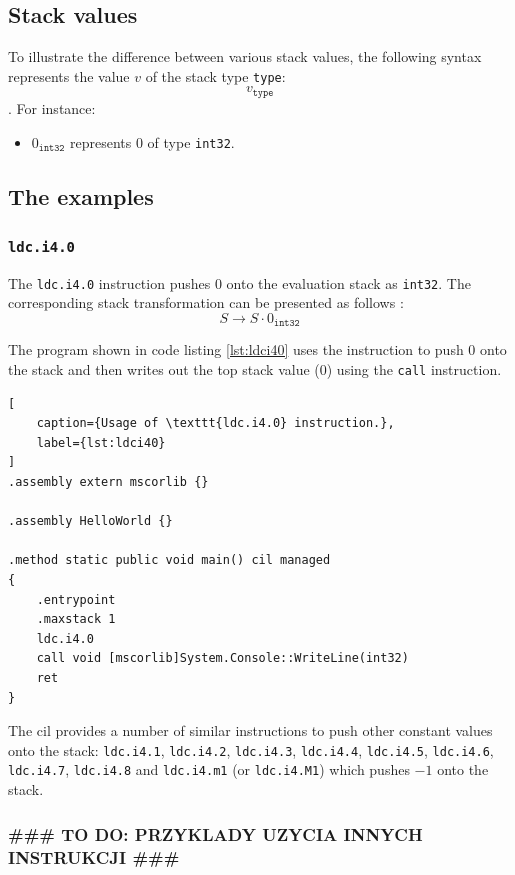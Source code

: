 \documentclass{article}
\numberwithin{equation}{section}
\newcommand{\sval}[2] {
	#1_\texttt{#2}
}
\begin{document}
\subsection{Stack values}

To illustrate the difference between various stack values, the following syntax represents the value $v$ of the stack type \texttt{type}:
$$
	\sval{v}{type}
$$.
For instance:
\begin{itemize}
	\item{$\sval{0}{int32}$ represents $0$ of type \texttt{int32}}.
\end{itemize}

\subsection{The examples}
\label{sec:instruction_examples}

\subsubsection{\texttt{ldc.i4.0}}
\label{sec:desc_ldci40}

The \texttt{ldc.i4.0} instruction pushes $0$ onto the evaluation stack as \texttt{int32}. The corresponding stack transformation can be presented as follows \cite{ecmaStandard}:
$$
	S \rightarrow S \cdot 0_\texttt{int32}
$$

The program shown in code listing \ref{lst:ldci40} uses the instruction to push $0$ onto the stack and then writes out the top stack value ($0$) using the \texttt{call} instruction.

\begin{lstlisting}[
	caption={Usage of \texttt{ldc.i4.0} instruction.},
	label={lst:ldci40}
]
.assembly extern mscorlib {}

.assembly HelloWorld {}

.method static public void main() cil managed
{
	.entrypoint
	.maxstack 1
	ldc.i4.0
	call void [mscorlib]System.Console::WriteLine(int32)
	ret
}
\end{lstlisting}

The \acrshort{cil} provides a number of similar instructions to push other constant values onto the stack: \texttt{ldc.i4.1}, \texttt{ldc.i4.2}, \texttt{ldc.i4.3}, \texttt{ldc.i4.4}, \texttt{ldc.i4.5}, \texttt{ldc.i4.6}, \texttt{ldc.i4.7}, \texttt{ldc.i4.8} and \texttt{ldc.i4.m1} (or \texttt{ldc.i4.M1}) which pushes $-1$ onto the stack.

\subsubsection{{\#\#\# TO DO: PRZYKLADY UZYCIA INNYCH INSTRUKCJI \#\#\#}}
\end{document}

